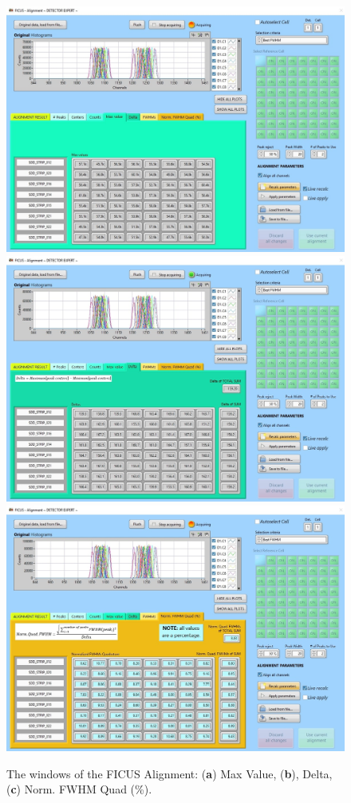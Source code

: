 \documentclass[a4paper,12pt,oneside,pdflatex,italian,final,twocolumn]{article}
\begin{document}
\begin{figure}[h]
\centering
\subfloat
{\includegraphics[width=.6\textwidth]{Capture27.jpg}} \\
\subfloat
{\includegraphics[width=.6\textwidth]{Capture28.jpg}} \\
\subfloat
{\includegraphics[width=.6\textwidth]{Capture30.jpg}} \\
\caption{The windows of the FICUS Alignment: (\textbf{a}) Max Value, (\textbf{b}), Delta, (\textbf{c}) Norm. FWHM Quad (\%).}\label{fig:fig22}
\end{figure}

\clearpage
\end{document}
